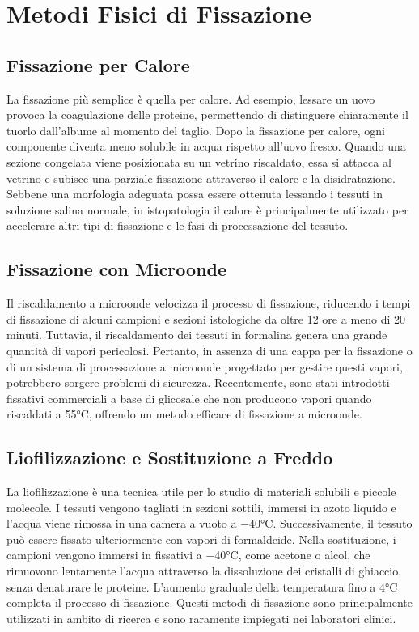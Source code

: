 \section{Metodi Fisici di Fissazione}
\subsection{Fissazione per Calore}
La fissazione più semplice è quella per calore. Ad esempio, lessare un uovo provoca la coagulazione delle proteine, permettendo di distinguere chiaramente il tuorlo dall'albume al momento del taglio. Dopo la fissazione per calore, ogni componente diventa meno solubile in acqua rispetto all'uovo fresco. Quando una sezione congelata viene posizionata su un vetrino riscaldato, essa si attacca al vetrino e subisce una parziale fissazione attraverso il calore e la disidratazione. Sebbene una morfologia adeguata possa essere ottenuta lessando i tessuti in soluzione salina normale, in istopatologia il calore è principalmente utilizzato per accelerare altri tipi di fissazione e le fasi di processazione del tessuto.

\subsection{Fissazione con Microonde}
Il riscaldamento a microonde velocizza il processo di fissazione, riducendo i tempi di fissazione di alcuni campioni e sezioni istologiche da oltre 12 ore a meno di 20 minuti. Tuttavia, il riscaldamento dei tessuti in formalina genera una grande quantità di vapori pericolosi. Pertanto, in assenza di una cappa per la fissazione o di un sistema di processazione a microonde progettato per gestire questi vapori, potrebbero sorgere problemi di sicurezza. Recentemente, sono stati introdotti fissativi commerciali a base di glicosale che non producono vapori quando riscaldati a 55°C, offrendo un metodo efficace di fissazione a microonde.

\subsection{Liofilizzazione e Sostituzione a Freddo}
La liofilizzazione è una tecnica utile per lo studio di materiali solubili e piccole molecole. I tessuti vengono tagliati in sezioni sottili, immersi in azoto liquido e l'acqua viene rimossa in una camera a vuoto a −40°C. Successivamente, il tessuto può essere fissato ulteriormente con vapori di formaldeide. Nella sostituzione, i campioni vengono immersi in fissativi a −40°C, come acetone o alcol, che rimuovono lentamente l'acqua attraverso la dissoluzione dei cristalli di ghiaccio, senza denaturare le proteine. L'aumento graduale della temperatura fino a 4°C completa il processo di fissazione. Questi metodi di fissazione sono principalmente utilizzati in ambito di ricerca e sono raramente impiegati nei laboratori clinici.


